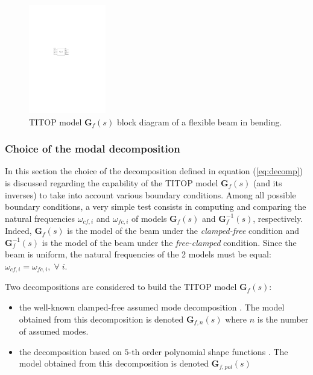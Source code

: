 \documentclass[smallcondensed]{svjour3}     %
\begin{document}
\begin{figure}[htbp!]
  \includegraphics[width=0.3\textwidth]{TyRzb}
\caption{TITOP model $\mathbf{G}_{f}(s)$ block diagram of a flexible beam in bending.}
\label{fig:TyRz} 
\end{figure}

\subsubsection{Choice of the modal decomposition}
In this section the choice of the decomposition defined in equation (\ref{eq:decomp}) is discussed regarding the capability of the TITOP model $\mathbf{G}_{f}(s)$  (and its inverses) to take into account various boundary conditions. Among all possible boundary conditions, a very simple test consists in computing and comparing the natural frequencies $\omega_{cf,i}$ and $\omega_{fc,i}$ of models $\mathbf{G}_{f}(s)$ and $\mathbf{G}_{f}^{-1}(s)$, respectively. Indeed, $\mathbf{G}_{f}(s)$ is the model of the beam under the \textit{clamped-free} condition and $\mathbf{G}_{f}^{-1}(s)$ is the model of the beam under the \textit{free-clamped} condition. Since the beam is uniform, the natural frequencies of the 2 models must be equal: $\omega_{cf,i}=\omega_{fc,i},\;\forall\;i$.

Two decompositions are considered to build the TITOP model  $\mathbf{G}_{f}(s)$:
\begin{itemize}
\item the well-known clamped-free assumed mode decomposition \cite{MohanSahaMSD2007}. The model obtained from this decomposition is denoted $\mathbf{G}_{f,n}(s)$ where $n$ is the number of assumed modes.
\item the decomposition based on $5$-th order polynomial shape functions \cite{Murali2015}. The model obtained from this decomposition is denoted $\mathbf{G}_{f,pol}(s)$
\end{itemize}
\end{document}
